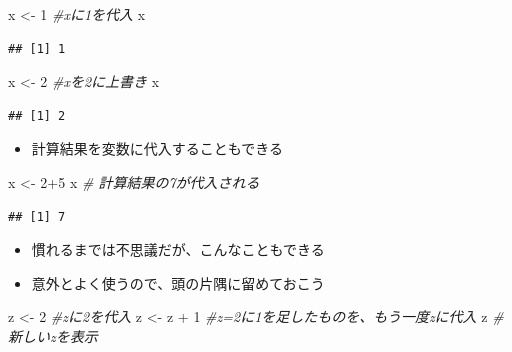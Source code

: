 \documentclass[
]{book}
\newenvironment{Shaded}{\begin{snugshade}}{\end{snugshade}}
\newcommand{\CommentTok}[1]{\textcolor[rgb]{0.56,0.35,0.01}{\textit{#1}}}
\newcommand{\DecValTok}[1]{\textcolor[rgb]{0.00,0.00,0.81}{#1}}
\newcommand{\NormalTok}[1]{#1}
\newcommand{\OtherTok}[1]{\textcolor[rgb]{0.56,0.35,0.01}{#1}}
\newcommand{\SpecialCharTok}[1]{\textcolor[rgb]{0.00,0.00,0.00}{#1}}
\providecommand{\tightlist}{%
  \setlength{\itemsep}{0pt}\setlength{\parskip}{0pt}}
\begin{document}
\begin{Shaded}
\begin{Highlighting}[]
\NormalTok{x }\OtherTok{\textless{}{-}} \DecValTok{1} \CommentTok{\#xに1を代入}
\NormalTok{x}
\end{Highlighting}
\end{Shaded}

\begin{verbatim}
## [1] 1
\end{verbatim}

\begin{Shaded}
\begin{Highlighting}[]
\NormalTok{x }\OtherTok{\textless{}{-}} \DecValTok{2} \CommentTok{\#xを2に上書き}
\NormalTok{x}
\end{Highlighting}
\end{Shaded}

\begin{verbatim}
## [1] 2
\end{verbatim}

\begin{itemize}
\tightlist
\item
  計算結果を変数に代入することもできる
\end{itemize}

\begin{Shaded}
\begin{Highlighting}[]
\NormalTok{x }\OtherTok{\textless{}{-}} \DecValTok{2}\SpecialCharTok{+}\DecValTok{5} 
\NormalTok{x }\CommentTok{\# 計算結果の7が代入される}
\end{Highlighting}
\end{Shaded}

\begin{verbatim}
## [1] 7
\end{verbatim}

\begin{itemize}
\tightlist
\item
  慣れるまでは不思議だが、こんなこともできる
\item
  意外とよく使うので、頭の片隅に留めておこう
\end{itemize}

\begin{Shaded}
\begin{Highlighting}[]
\NormalTok{z }\OtherTok{\textless{}{-}} \DecValTok{2} \CommentTok{\#zに2を代入}
\NormalTok{z }\OtherTok{\textless{}{-}}\NormalTok{ z }\SpecialCharTok{+} \DecValTok{1} \CommentTok{\#z=2に1を足したものを、もう一度zに代入}
\NormalTok{z }\CommentTok{\#新しいzを表示}
\end{Highlighting}
\end{Shaded}
\end{document}
